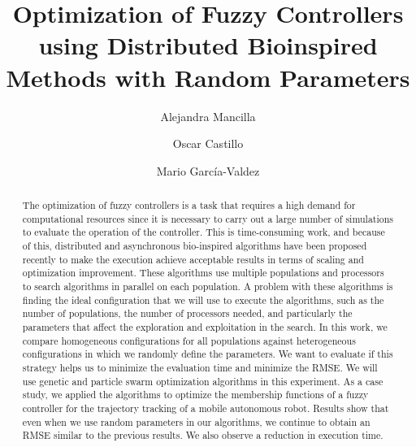 \documentclass[runningheads]{llncs}
\begin{document}
%
\title{Optimization of Fuzzy Controllers using Distributed Bioinspired Methods with Random Parameters} 

%
%
\author{Alejandra Mancilla \and
Oscar Castillo \and
Mario García-Valdez}
%
%

%
\maketitle              %
%
\begin{abstract}

     The optimization of fuzzy controllers is a task that requires a high
     demand for computational resources since it is necessary to carry out a
     large number of simulations to evaluate the operation of the controller.
     This is time-consuming work, and because of this, distributed and
     asynchronous bio-inspired algorithms have been proposed recently to make
     the execution achieve acceptable results in terms of scaling and
     optimization improvement. These algorithms use multiple populations and
     processors to search algorithms in parallel on each population. A problem
     with these algorithms is finding the ideal configuration that we will use
     to execute the algorithms, such as the number of populations, the number
     of processors needed, and particularly the parameters that affect the
     exploration and exploitation in the search. In this work, we compare
     homogeneous configurations for all populations against heterogeneous
     configurations in which we randomly define the parameters. We want to
     evaluate if this strategy helps us to minimize the evaluation time and
     minimize the RMSE. We will use genetic and particle swarm optimization
     algorithms in this experiment. As a case study, we applied the algorithms
     to optimize the membership functions of a fuzzy controller for the
     trajectory tracking of a mobile autonomous robot. Results show that even
     when we use random parameters in our algorithms, we continue to obtain an
     RMSE similar to the previous results. We also observe a reduction in
     execution time.    

\end{abstract}
%
%
\end{document}
